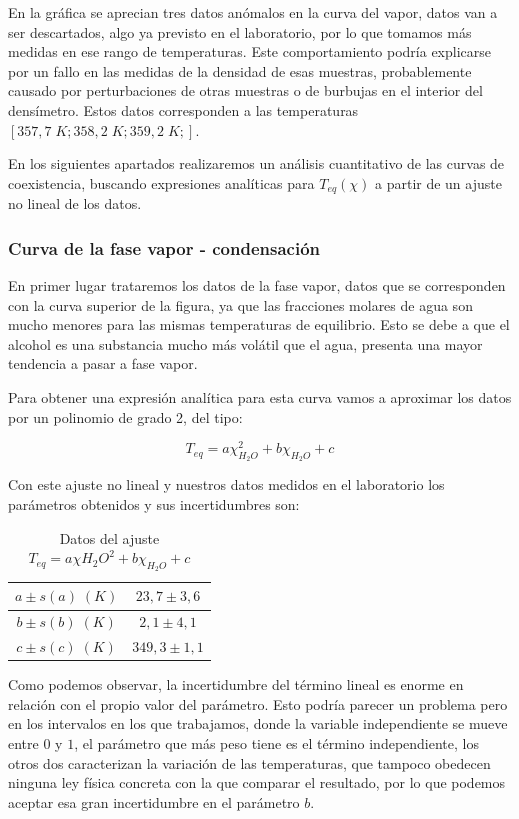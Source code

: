 \documentclass[a4paper,12pt,titlepage]{article}
\begin{document}
En la gráfica se aprecian tres datos anómalos en la curva del vapor, datos van a ser descartados, algo ya previsto en el laboratorio, por lo que tomamos más medidas en ese rango de temperaturas. Este comportamiento podría explicarse por un fallo en las medidas de la densidad de esas muestras, probablemente causado por perturbaciones de otras muestras o de burbujas en el interior del densímetro. Estos datos corresponden a las temperaturas $[357,7 \;K;358,2\;K;359,2 \;K;]$.

En los siguientes apartados realizaremos un análisis cuantitativo de las curvas de coexistencia, buscando expresiones analíticas para $T_{eq}(\chi)$ a partir de un ajuste no lineal de los datos.

\subsubsection{Curva de la fase vapor - condensación}

En primer lugar trataremos los datos de la fase vapor, datos que se corresponden con la curva superior de la figura, ya que las fracciones molares de agua son mucho menores para las mismas temperaturas de equilibrio. Esto se debe a que el alcohol es una substancia mucho más volátil que el agua, presenta una mayor tendencia a pasar a fase vapor.

Para obtener una expresión analítica para esta curva vamos a aproximar los datos por un polinomio de grado 2, del tipo:

\begin{equation}
    T_{eq} = a \chi_{H_2O}^2 + b\chi_{H_2O} + c
\end{equation}

Con este ajuste no lineal y nuestros datos medidos en el laboratorio los parámetros obtenidos y sus incertidumbres son:

\begin{table}[h!]
    \centering
    \begin{tabular}{|c|c|}
    \hline
    $a \pm s(a) \;(K)$ &  $23,7 \pm 3,6$\\ \hline
    $b\pm s(b) \; (K)$ & $2,1 \pm 4,1$ \\ \hline
    $c \pm s(c) \; (K)$ & $349,3 \pm 1,1$\\ \hline
    \end{tabular}
    \caption{Datos del ajuste $T_{eq} = a \chi{H_2O}^2 + b\chi_{H_2O} + c$}
    \label{tab:my_label}
\end{table}

Como podemos observar, la incertidumbre del término lineal es enorme en relación con el propio valor del parámetro. Esto podría parecer un problema pero en los intervalos en los que trabajamos, donde la variable independiente se mueve entre $0$ y $1$, el parámetro que más peso tiene es el término independiente, los otros dos caracterizan la variación de las temperaturas, que tampoco obedecen ninguna ley física concreta con la que comparar el resultado, por lo que podemos aceptar esa gran incertidumbre en el parámetro $b$.
\end{document}
